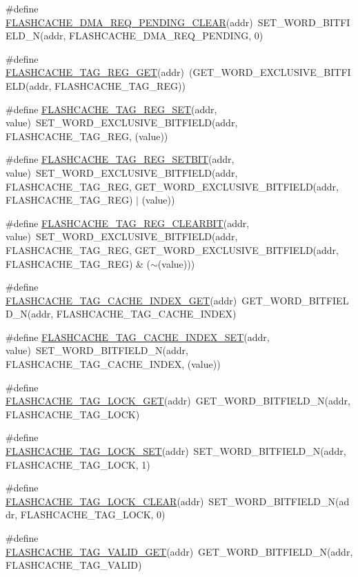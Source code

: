 \begin{DoxyCompactItemize}
\item 
\#define \hyperlink{a00549_a957ac39ae41693c6395730e35eff1de4}{FLASHCACHE\_\-DMA\_\-REQ\_\-PENDING\_\-CLEAR}(addr)~SET\_\-WORD\_\-BITFIELD\_\-N(addr, FLASHCACHE\_\-DMA\_\-REQ\_\-PENDING, 0)
\item 
\#define \hyperlink{a00549_a89d3ce456670ddf1354c51826e5874a2}{FLASHCACHE\_\-TAG\_\-REG\_\-GET}(addr)~(GET\_\-WORD\_\-EXCLUSIVE\_\-BITFIELD(addr, FLASHCACHE\_\-TAG\_\-REG))
\item 
\#define \hyperlink{a00549_a9442314e4f4742e333169cf4db81207e}{FLASHCACHE\_\-TAG\_\-REG\_\-SET}(addr, value)~SET\_\-WORD\_\-EXCLUSIVE\_\-BITFIELD(addr, FLASHCACHE\_\-TAG\_\-REG, (value))
\item 
\#define \hyperlink{a00549_a7e49fcfd4ab3d22d44cfe4ede512d034}{FLASHCACHE\_\-TAG\_\-REG\_\-SETBIT}(addr, value)~SET\_\-WORD\_\-EXCLUSIVE\_\-BITFIELD(addr, FLASHCACHE\_\-TAG\_\-REG, GET\_\-WORD\_\-EXCLUSIVE\_\-BITFIELD(addr, FLASHCACHE\_\-TAG\_\-REG) $|$ (value))
\item 
\#define \hyperlink{a00549_a7c344e301182a21febe46af2ab7b5664}{FLASHCACHE\_\-TAG\_\-REG\_\-CLEARBIT}(addr, value)~SET\_\-WORD\_\-EXCLUSIVE\_\-BITFIELD(addr, FLASHCACHE\_\-TAG\_\-REG, GET\_\-WORD\_\-EXCLUSIVE\_\-BITFIELD(addr, FLASHCACHE\_\-TAG\_\-REG) \& ($\sim$(value)))
\item 
\#define \hyperlink{a00549_a49fdf74371fba8906585edac59fba01f}{FLASHCACHE\_\-TAG\_\-CACHE\_\-INDEX\_\-GET}(addr)~GET\_\-WORD\_\-BITFIELD\_\-N(addr, FLASHCACHE\_\-TAG\_\-CACHE\_\-INDEX)
\item 
\#define \hyperlink{a00549_a7b3a33f848111a85d98f23c5f527ca46}{FLASHCACHE\_\-TAG\_\-CACHE\_\-INDEX\_\-SET}(addr, value)~SET\_\-WORD\_\-BITFIELD\_\-N(addr, FLASHCACHE\_\-TAG\_\-CACHE\_\-INDEX, (value))
\item 
\#define \hyperlink{a00549_a29e52ff5d0b41f0bc97a5a7577f1774a}{FLASHCACHE\_\-TAG\_\-LOCK\_\-GET}(addr)~GET\_\-WORD\_\-BITFIELD\_\-N(addr, FLASHCACHE\_\-TAG\_\-LOCK)
\item 
\#define \hyperlink{a00549_a276ee33b17d88223d765191db5e0c6ef}{FLASHCACHE\_\-TAG\_\-LOCK\_\-SET}(addr)~SET\_\-WORD\_\-BITFIELD\_\-N(addr, FLASHCACHE\_\-TAG\_\-LOCK, 1)
\item 
\#define \hyperlink{a00549_a63432919d934ed0e183d4c001942f3d7}{FLASHCACHE\_\-TAG\_\-LOCK\_\-CLEAR}(addr)~SET\_\-WORD\_\-BITFIELD\_\-N(addr, FLASHCACHE\_\-TAG\_\-LOCK, 0)
\item 
\#define \hyperlink{a00549_af4381d5be9b3e5632c0965c7ffe77a7e}{FLASHCACHE\_\-TAG\_\-VALID\_\-GET}(addr)~GET\_\-WORD\_\-BITFIELD\_\-N(addr, FLASHCACHE\_\-TAG\_\-VALID)

\end{DoxyCompactItemize}
